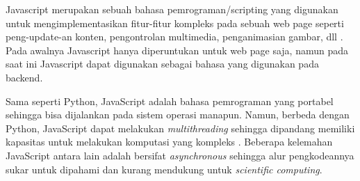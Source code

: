 

        Javascript merupakan sebuah bahasa pemrograman/scripting yang digunakan untuk
        mengimplementasikan fitur-fitur kompleks pada sebuah web page seperti peng-update-an
        konten, pengontrolan multimedia, penganimasian gambar, dll \citep{js}. Pada awalnya Javascript hanya
        diperuntukan untuk web page saja, namun pada saat ini Javascript dapat digunakan sebagai
        bahasa yang digunakan pada backend.

        Sama seperti Python, JavaScript adalah bahasa pemrograman yang portabel sehingga bisa dijalankan pada sistem operasi manapun.
        Namun, berbeda dengan Python, JavaScript dapat melakukan \textit{multithreading} sehingga dipandang memiliki kapasitas untuk
        melakukan komputasi yang kompleks \citep{jsDisad}. Beberapa kelemahan JavaScript antara lain adalah bersifat \textit{asynchronous} sehingga
        alur pengkodeannya sukar untuk dipahami dan kurang mendukung untuk \textit{scientific computing}.
        

